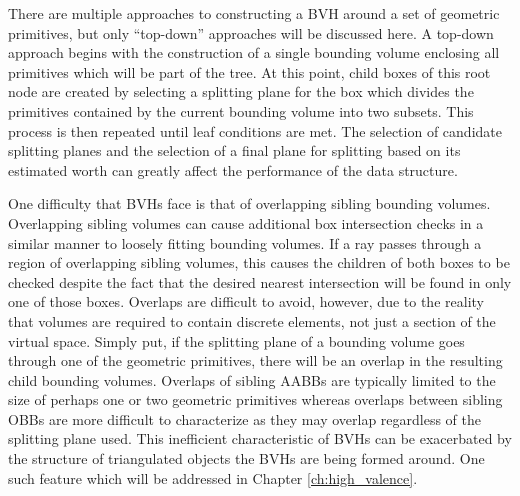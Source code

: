 There are multiple approaches to constructing a BVH around a set
of geometric primitives, but only ``top-down'' approaches will be discussed
here. A top-down approach begins with the construction of a single bounding
volume enclosing all primitives which will be part of the tree. At this point,
child boxes of this root node are created by selecting a splitting plane for
the box which divides the primitives contained by the current bounding volume
into two subsets. This process is then repeated until leaf conditions are
met. The selection of candidate splitting planes and the selection of a final
plane for splitting based on its estimated worth can greatly affect the
performance of the data structure.

One difficulty that BVHs face is that of overlapping sibling bounding
volumes. Overlapping sibling volumes can cause additional box intersection
checks in a similar manner to loosely fitting bounding volumes. If a ray passes
through a region of overlapping sibling volumes, this causes the children of
both boxes to be checked despite the fact that the desired nearest intersection
will be found in only one of those boxes. Overlaps are difficult to avoid,
however, due to the reality that volumes are required to contain discrete
elements, not just a section of the virtual space. Simply put, if
the splitting plane of a bounding volume goes through one of the geometric
primitives, there will be an overlap in the resulting child bounding
volumes. Overlaps of sibling AABBs are typically limited to the size of perhaps
one or two geometric primitives whereas overlaps between sibling OBBs are more
difficult to characterize as they may overlap regardless of the splitting plane
used. This inefficient characteristic of BVHs can be exacerbated by the
structure of triangulated objects the BVHs are being formed around. One such
feature which will be addressed in Chapter \ref{ch:high_valence}.

